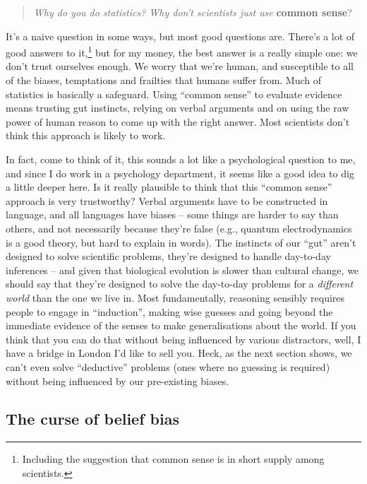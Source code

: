 \documentclass[
  a4paper,
]{book}
\begin{document}
\begin{quote}
\emph{Why do you do statistics? Why don't scientists just use}
\textbf{common sense}?
\end{quote}

It's a naive question in some ways, but most good questions are. There's
a lot of good answers to it,\footnote{Including the suggestion that
  common sense is in short supply among scientists.} but for my money,
the best answer is a really simple one: we don't trust ourselves enough.
We worry that we're human, and susceptible to all of the biases,
temptations and frailties that humans suffer from. Much of statistics is
basically a safeguard. Using ``common sense'' to evaluate evidence means
trusting gut instincts, relying on verbal arguments and on using the raw
power of human reason to come up with the right answer. Most scientists
don't think this approach is likely to work.

In fact, come to think of it, this sounds a lot like a psychological
question to me, and since I do work in a psychology department, it seems
like a good idea to dig a little deeper here. Is it really plausible to
think that this ``common sense'' approach is very trustworthy? Verbal
arguments have to be constructed in language, and all languages have
biases -- some things are harder to say than others, and not necessarily
because they're false (e.g., quantum electrodynamics is a good theory,
but hard to explain in words). The instincts of our ``gut'' aren't
designed to solve scientific problems, they're designed to handle
day-to-day inferences -- and given that biological evolution is slower
than cultural change, we should say that they're designed to solve the
day-to-day problems for a \emph{different world} than the one we live
in. Most fundamentally, reasoning sensibly requires people to engage in
``induction'', making wise guesses and going beyond the immediate
evidence of the senses to make generalisations about the world. If you
think that you can do that without being influenced by various
distractors, well, I have a bridge in London I'd like to sell you. Heck,
as the next section shows, we can't even solve ``deductive'' problems
(ones where no guessing is required) without being influenced by our
pre-existing biases.

\subsection{The curse of belief bias}\label{the-curse-of-belief-bias}
\end{document}
